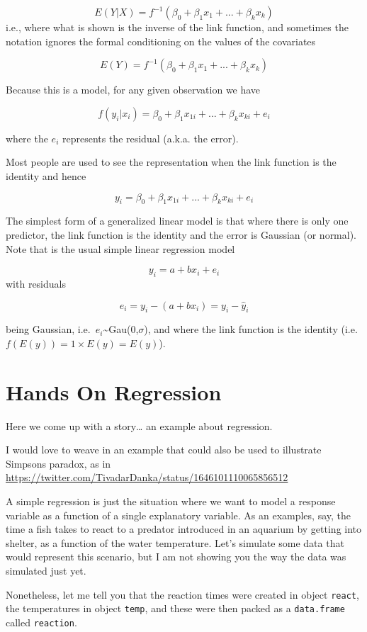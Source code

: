 \documentclass[
]{book}
\begin{document}
\[ E(Y|X) =  f^{-1}(\beta_0+\beta_1 x_1 + ... + \beta_k x_k) \]
i.e., where what is shown is the inverse of the link function,
and sometimes the notation ignores the formal conditioning on the values of the covariates

\[ E(Y) =  f^{-1}(\beta_0+\beta_1 x_1 + ... + \beta_k x_k) \]

Because this is a model, for any given observation we have

\[ f{(y_i|x_i)} =  \beta_0+\beta_1 x_{1i} + ... + \beta_k x_{ki} + e_i \]

where the \(e_i\) represents the residual (a.k.a. the error).

Most people are used to see the representation when the link function is the identity and hence

\[ y_i =  \beta_0+\beta_1 x_{1i} + ... + \beta_k x_{ki} + e_i \]

The simplest form of a generalized linear model is that where there is only one predictor, the link function is the identity and the error is Gaussian (or normal). Note that is the usual simple linear regression model

\[y_i=a+bx_i+e_i\]
with residuals

\[e_i=y_i - (a+bx_i)= y_i-\hat y_i\]

being Gaussian, i.e.~\(e_i\)\textasciitilde Gau(0,\(\sigma\)), and where the link function is the identity (i.e.~\(f(E(y))=1 \times E(y)=E(y)\)).

\hypertarget{handson}{%
\chapter{Hands On Regression}\label{handson}}

Here we come up with a story\ldots{} an example about regression.

I would love to weave in an example that could also be used to illustrate Simpsons paradox, as in \url{https://twitter.com/TivadarDanka/status/1646101110065856512}

A simple regression is just the situation where we want to model a response variable as a function of a single explanatory variable. As an examples, say, the time a fish takes to react to a predator introduced in an aquarium by getting into shelter, as a function of the water temperature. Let's simulate some data that would represent this scenario, but I am not showing you the way the data was simulated just yet.

Nonetheless, let me tell you that the reaction times were created in object \texttt{react}, the temperatures in object \texttt{temp}, and these were then packed as a \texttt{data.frame} called \texttt{reaction}.
\end{document}
